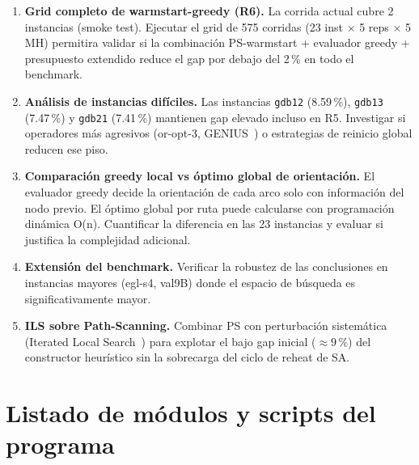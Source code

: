 \documentclass[11pt,a4paper]{article}
\theoremstyle{definition}
\theoremstyle{remark}
\begin{document}
\begin{enumerate}
\item \textbf{Grid completo de warmstart-greedy (R6).} La corrida
  actual cubre 2 instancias (smoke test). Ejecutar el grid de
  575 corridas (23 inst $\times$ 5 reps $\times$ 5 MH) permitira
  validar si la combinación PS-warmstart + evaluador greedy + presupuesto
  extendido reduce el gap por debajo del 2\,\% en todo el benchmark.
\item \textbf{Análisis de instancias difíciles.} Las instancias
  \texttt{gdb12} (8.59\,\%), \texttt{gdb13} (7.47\,\%) y
  \texttt{gdb21} (7.41\,\%) mantienen gap elevado incluso en R5.
  Investigar si operadores más agresivos (or-opt-3, GENIUS~\cite{gendreau1992}) o
  estrategias de reinicio global reducen ese piso.
\item \textbf{Comparación greedy local vs óptimo global de orientación.}
  El evaluador greedy decide la orientación de cada arco solo con
  información del nodo previo. El óptimo global por ruta puede
  calcularse con programación dinámica O(n). Cuantificar la diferencia
  en las 23 instancias y evaluar si justifica la complejidad adicional.
\item \textbf{Extensión del benchmark.} Verificar la robustez de las
  conclusiones en instancias mayores (egl-s4, val9B) donde el espacio
  de búsqueda es significativamente mayor.
\item \textbf{ILS sobre Path-Scanning.} Combinar PS con perturbación
  sistemática (Iterated Local Search~\cite{lourenco2003}) para explotar el bajo gap inicial
  ($\approx 9$\,\%) del constructor heurístico sin la sobrecarga del
  ciclo de reheat de SA.
\end{enumerate}

\appendix

\section{Listado de módulos y scripts del programa}
\end{document}
